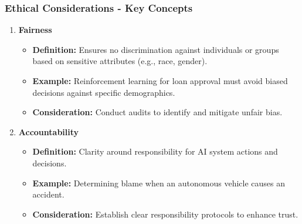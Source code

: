\documentclass[aspectratio=169]{beamer}
\begin{document}
\begin{frame}[fragile]
    \frametitle{Ethical Considerations - Key Concepts}
    \begin{enumerate}
        \item \textbf{Fairness}
        \begin{itemize}
            \item \textbf{Definition:} Ensures no discrimination against individuals or groups based on sensitive attributes (e.g., race, gender).
            \item \textbf{Example:} Reinforcement learning for loan approval must avoid biased decisions against specific demographics.
            \item \textbf{Consideration:} Conduct audits to identify and mitigate unfair bias.
        \end{itemize}
        
        \item \textbf{Accountability}
        \begin{itemize}
            \item \textbf{Definition:} Clarity around responsibility for AI system actions and decisions.
            \item \textbf{Example:} Determining blame when an autonomous vehicle causes an accident.
            \item \textbf{Consideration:} Establish clear responsibility protocols to enhance trust.
        \end{itemize}
    \end{enumerate}
\end{frame}
\end{document}
